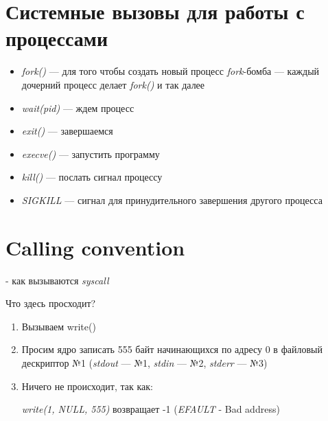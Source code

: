 \documentclass[../../lectures.tex]{subfiles}
\begin{document}
\section{Системные вызовы для работы с процессами}
\begin{itemize}
    \item \emph{fork()} --- для того чтобы создать новый процесс
    \emph{fork}-бомба --- каждый дочерний процесс делает \emph{fork()} и так далее
    \item \emph{wait(pid)} --- ждем процесс
    \item \emph{exit()} --- завершаемся
    \item \emph{execve()} --- запустить программу
    \item \emph{kill()} --- послать сигнал процессу
    \item \emph{SIGKILL} --- сигнал для принудительного завершения другого процесса 

\end{itemize}

\section{Calling convention}
 - как вызываются \emph{syscall}


Что здесь просходит?
\begin{enumerate}
    \item Вызываем write()
    \item Просим ядро записать 555 байт начинающихся по адресу 0 в файловый дескриптор №1 
          (\emph{stdout} --- №1, \emph{stdin} --- №2, \emph{stderr} --- №3)
    \item Ничего не происходит, так как:

          \emph{write(1, NULL, 555)} возвращает -1 (\emph{EFAULT} - Bad address)
\end{enumerate}
\end{document}
